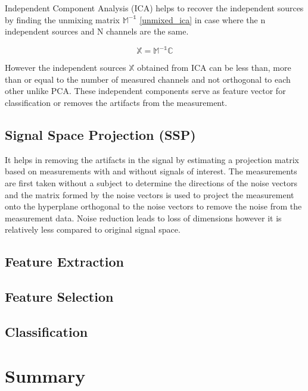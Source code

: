 Independent Component Analysis (ICA) helps to recover the independent sources by finding the unmixing matrix  $\mathbb{M^{-1}}$ \ref{unmixed_ica} in case where the n independent sources and 
N channels are the same.

\begin{equation} \label{eq:unmixed_ica}
    \mathbb{X} = \mathbb{M^{-1}C}
\end{equation}

However the independent sources $\mathbb{X}$ obtained from ICA can be less than, more than or equal to the number of measured channels and not orthogonal to each other unlike PCA. These independent
components serve as feature vector for classification or removes the artifacts from the measurement.

\subsection{Signal Space Projection (SSP)}
It helps in removing the artifacts in the signal by estimating a projection matrix based on measurements with and without signals of interest. The measurements are first taken without a subject to
determine the directions of the noise vectors and the matrix formed by the noise vectors is used to project the measurement onto the hyperplane orthogonal to the noise vectors to remove the noise 
from the measurement data. Noise reduction leads to loss of dimensions however it is relatively less compared to original signal space.  

\subsection{Feature Extraction}

\subsection{Feature Selection}

\subsection{Classification}

\section*{Summary}

